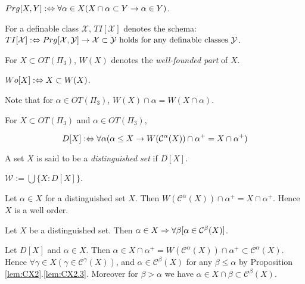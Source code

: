 \documentclass{article}
\begin{document}
\begin{definition}\label{df:wftg}
{\rm
\benu
\item 
$Prg[X,Y] :\Leftrightarrow \forall\alpha\in X(X\cap\alpha\subset Y \to \alpha\in Y)$.

\item 
For a definable class $\mathcal{X}$, $TI[\mathcal{X}]$ denotes the schema:\\
$TI[\mathcal{X}] :\Leftrightarrow Prg[\mathcal{X},\mathcal{Y}]\to \mathcal{X}\subset\mathcal{Y} \mbox{ {\rm holds for} any definable classes } \mathcal{Y}$.
\item
For $X\subset OT(\Pi_{3})$, $W(X)$ denotes the \textit{well-founded part} of $X$. 
\item 
$Wo[X] : \Leftrightarrow X\subset W(X)$.
\eenu
}
\end{definition}
Note that for $\alpha\in OT(\Pi_{3})$,
$W(X)\cap\alpha=W(X\cap\alpha)$.





\begin{definition} \label{df:3wfdtg32}
{\rm 
For $X\subset OT(\Pi_{3})$ and
$\alpha\in OT(\Pi_{3})$,
\benu
\item\label{df:3wfdtg.832}
\begin{equation}\label{eq:distinguishedclass}
D[X] :\Leftrightarrow 
\forall\alpha(\alpha\leq X\to W(\mathcal{C}^{\alpha}(X))\cap\alpha^{+}= X\cap\alpha^{+})
\end{equation}

A set $X$ is said to be a \textit{distinguished set} if $D[X]$. 



\item\label{df:3wfdtg.932}
$\mathcal{W}:=\bigcup\{X :D[X]\}$.


\eenu
}
\end{definition}


Let $\alpha\in X$ for a distinguished set $X$. 
Then $W(\mathcal{C}^{\alpha}(X))\cap\alpha^{+}= X\cap\alpha^{+}$.
Hence $X$ is a well order.



\begin{proposition}\label{lem:3.11.632}
Let $X$ be a distinguished set. Then
$\alpha\in X \Rightarrow \forall\beta[\alpha\in \mathcal{C}^{\beta}(X)]$.
\end{proposition}
\bprf
Let $D[X]$ and $\alpha\in X$. 
Then $\alpha\in X\cap\alpha^{+}=W(\mathcal{C}^{\alpha}(X))\cap\alpha^{+}\subset \mathcal{C}^{\alpha}(X)$.
Hence $\forall\gamma\in X(\gamma\in\mathcal{C}^{\gamma}(X))$, and
$\alpha\in\mathcal{C}^{\beta}(X)$ for any $\beta\leq\alpha$ by Proposition \ref{lem:CX2}.\ref{lem:CX2.3}. 
Moreover for $\beta>\alpha$ we have $\alpha\in X\cap\beta\subset\mathcal{C}^{\beta}(X)$.
\eprf
\end{document}
